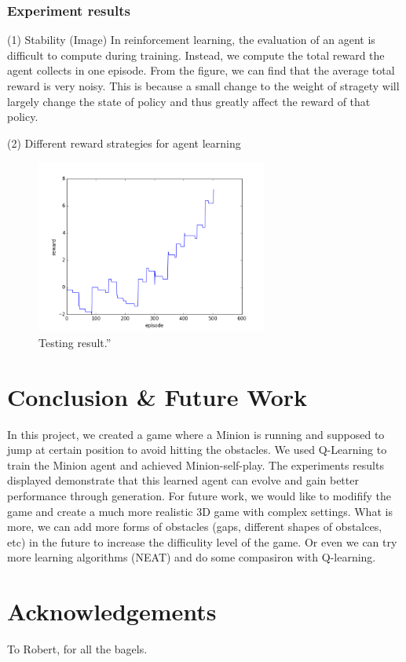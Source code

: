 \documentclass{acmsiggraph}
\begin{document}
\subsubsection{Experiment results}
(1) Stability (Image)
In reinforcement learning, the evaluation of an agent is difficult to compute during training. Instead, we compute the total reward the agent collects in one episode. From the figure, we can find that the average total reward is very noisy. This is because a small change to the weight of stragety will largely change the state of policy and thus greatly affect the reward of that policy. 

(2) Different reward strategies for agent learning





\begin{figure}[ht]
  \centering
  \includegraphics[width=3.0in]{../fig/reward_in_testing_5000.png}
  \caption{Testing result.''}
  \label{fig:result}
\end{figure}


\section{Conclusion \& Future Work}
In this project, we created a game where a Minion is running and supposed to jump at certain position to avoid hitting the obstacles. We used Q-Learning to train the Minion agent and achieved Minion-self-play. The experiments results displayed demonstrate that this learned agent can evolve and gain better performance through generation. 
For future work, we would like to modifify the game and create a much more realistic 3D game with complex settings. What is more, we can add more forms of obstacles (gaps, different shapes of obstalces, etc) in the future to increase the difficulity level of the game. Or even we can try more learning algorithms (NEAT) and do some compasiron with Q-learning.


\section*{Acknowledgements}

To Robert, for all the bagels.


\nocite{*}

\end{document}
